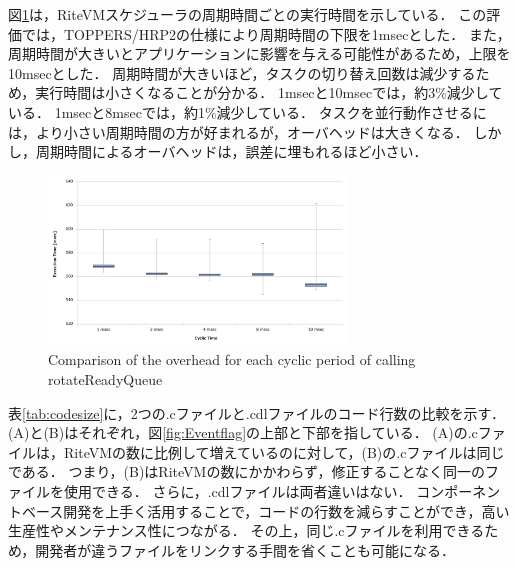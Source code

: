 \documentclass[submit]{ipsj_v2/UTF8/ipsj}
\begin{document}
図\ref{fig:comparison_msec}は，RiteVMスケジューラの周期時間ごとの実行時間を示している．
この評価では，TOPPERS/HRP2の仕様により周期時間の下限を1msecとした．
また，周期時間が大きいとアプリケーションに影響を与える可能性があるため，上限を10msecとした．
周期時間が大きいほど，タスクの切り替え回数は減少するため，実行時間は小さくなることが分かる．
1msecと10msecでは，約3\%減少している．
1msecと8msecでは，約1\%減少している．
タスクを並行動作させるには，より小さい周期時間の方が好まれるが，オーバヘッドは大きくなる．
しかし，周期時間によるオーバヘッドは，誤差に埋もれるほど小さい．


\begin{figure}[t]
    \centering
    \includegraphics[width=8cm,clip]{../EMSOFT2016/figure/comparison_msec.pdf}
    \caption{Comparison of the overhead for each cyclic period of calling rotateReadyQueue}
    \label{fig:comparison_msec}
\end{figure}

表\ref{tab:codesize}に，2つの.cファイルと.cdlファイルのコード行数の比較を示す．
(A)と(B)はそれぞれ，図\ref{fig:Eventflag}の上部と下部を指している．
(A)の.cファイルは，RiteVMの数に比例して増えているのに対して，(B)の.cファイルは同じである．
つまり，(B)はRiteVMの数にかかわらず，修正することなく同一のファイルを使用できる．
さらに，.cdlファイルは両者違いはない．
コンポーネントベース開発を上手く活用することで，コードの行数を減らすことができ，高い生産性やメンテナンス性につながる．
その上，同じ.cファイルを利用できるため，開発者が違うファイルをリンクする手間を省くことも可能になる．
\end{document}

